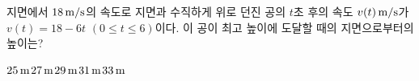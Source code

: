 지면에서 $18\mkern3mu \mathrm{m/s}$의 속도로 지면과 수직하게 위로 던진 공의 $t$초 후의 속도 $v(t)\mkern3mu \mathrm{m/s}$가 $v(t)=18-6t$ $(0\le t\le 6)$이다. 이 공이 최고 높이에 도달할 때의 지면으로부터의 높이는?
\begin{choices32}{$25\mkern3mu \mathrm{m}$}{$27\mkern3mu \mathrm{m}$}{$29\mkern3mu \mathrm{m}$}{$31\mkern3mu \mathrm{m}$}{$33\mkern3mu \mathrm{m}$}\end{choices32}
